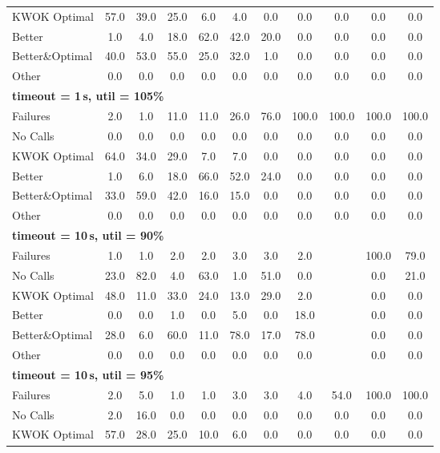 \begin{tabular}{l cccccccccc}
KWOK Optimal & 57.0 & 39.0 & 25.0 & 6.0 & 4.0 & 0.0 & 0.0 & 0.0 & 0.0 & 0.0 \\
Better & 1.0 & 4.0 & 18.0 & 62.0 & 42.0 & 20.0 & 0.0 & 0.0 & 0.0 & 0.0 \\
Better\&Optimal & 40.0 & 53.0 & 55.0 & 25.0 & 32.0 & 1.0 & 0.0 & 0.0 & 0.0 & 0.0 \\
Other & 0.0 & 0.0 & 0.0 & 0.0 & 0.0 & 0.0 & 0.0 & 0.0 & 0.0 & 0.0 \\
\midrule
\multicolumn{11}{l}{\textbf{timeout = 1\,s, util = 105\%}} \\
\midrule
Failures & 2.0 & 1.0 & 11.0 & 11.0 & 26.0 & 76.0 & 100.0 & 100.0 & 100.0 & 100.0 \\
No Calls & 0.0 & 0.0 & 0.0 & 0.0 & 0.0 & 0.0 & 0.0 & 0.0 & 0.0 & 0.0 \\
KWOK Optimal & 64.0 & 34.0 & 29.0 & 7.0 & 7.0 & 0.0 & 0.0 & 0.0 & 0.0 & 0.0 \\
Better & 1.0 & 6.0 & 18.0 & 66.0 & 52.0 & 24.0 & 0.0 & 0.0 & 0.0 & 0.0 \\
Better\&Optimal & 33.0 & 59.0 & 42.0 & 16.0 & 15.0 & 0.0 & 0.0 & 0.0 & 0.0 & 0.0 \\
Other & 0.0 & 0.0 & 0.0 & 0.0 & 0.0 & 0.0 & 0.0 & 0.0 & 0.0 & 0.0 \\
\midrule
\multicolumn{11}{l}{\textbf{timeout = 10\,s, util = 90\%}} \\
\midrule
Failures & 1.0 & 1.0 & 2.0 & 2.0 & 3.0 & 3.0 & 2.0 & \text{--} & 100.0 & 79.0 \\
No Calls & 23.0 & 82.0 & 4.0 & 63.0 & 1.0 & 51.0 & 0.0 & \text{--} & 0.0 & 21.0 \\
KWOK Optimal & 48.0 & 11.0 & 33.0 & 24.0 & 13.0 & 29.0 & 2.0 & \text{--} & 0.0 & 0.0 \\
Better & 0.0 & 0.0 & 1.0 & 0.0 & 5.0 & 0.0 & 18.0 & \text{--} & 0.0 & 0.0 \\
Better\&Optimal & 28.0 & 6.0 & 60.0 & 11.0 & 78.0 & 17.0 & 78.0 & \text{--} & 0.0 & 0.0 \\
Other & 0.0 & 0.0 & 0.0 & 0.0 & 0.0 & 0.0 & 0.0 & \text{--} & 0.0 & 0.0 \\
\midrule
\multicolumn{11}{l}{\textbf{timeout = 10\,s, util = 95\%}} \\
\midrule
Failures & 2.0 & 5.0 & 1.0 & 1.0 & 3.0 & 3.0 & 4.0 & 54.0 & 100.0 & 100.0 \\
No Calls & 2.0 & 16.0 & 0.0 & 0.0 & 0.0 & 0.0 & 0.0 & 0.0 & 0.0 & 0.0 \\
KWOK Optimal & 57.0 & 28.0 & 25.0 & 10.0 & 6.0 & 0.0 & 0.0 & 0.0 & 0.0 & 0.0 \\

\end{tabular}
